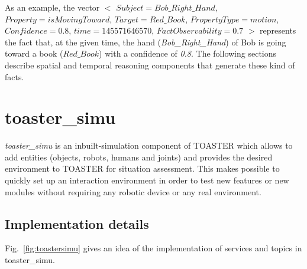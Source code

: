 \documentclass[a4paper]{article}
\begin{document}
As an example, the vector
$<$ $Subject = Bob\_Right\_Hand$, $Property = isMovingToward$, $Target = Red\_Book$, $PropertyType = motion$, $Confidence = 0.8$, $time = 145571646570$, $FactObservability = 0.7$ $>$ represents the fact that, at the given time, the hand (\textit{Bob\_Right\_Hand}) of Bob is going toward a book (\textit{$Red\_Book$}) with a confidence of \textit{0.8}. 
The following sections describe spatial and temporal reasoning components that generate these kind of facts.








\section{toaster\_simu}

\textit{toaster\_simu} is an inbuilt-simulation component of TOASTER which allows to add entities (objects, robots, humans and joints)
and provides the desired environment to TOASTER for situation assessment.
This makes possible to quickly set up an interaction environment in order to test new features or new modules without requiring any robotic device or any real environment.


\subsection{Implementation details}
Fig.~\ref{fig:toastersimu} gives an idea of the implementation of services and topics in toaster\_simu.

\end{document}
